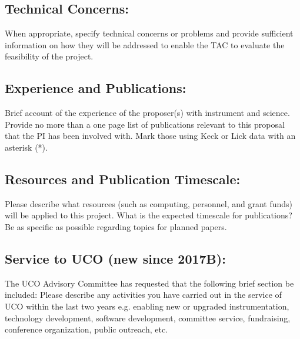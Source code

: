 \documentclass[letter,12pt]{article}
\begin{document}
\subsection{Technical Concerns:}
When appropriate, specify technical concerns or problems and provide sufficient information on how they will be addressed to enable the TAC to evaluate the feasibility of the project. 

\subsection{Experience and Publications:}
Brief account of the experience of the proposer(s) with instrument and science. Provide no more than a one page list of publications relevant to this proposal that the PI has been involved with. Mark those using Keck or Lick data with an asterisk (*). 

\subsection{Resources and Publication Timescale:}
Please describe what resources (such as computing, personnel, and grant funds) will be applied to this project. What is the expected timescale for publications? Be as specific as possible regarding topics for planned papers.

\subsection{Service to UCO (new since 2017B):}
The UCO Advisory Committee has requested that the following brief section be included: 
Please describe any activities you have carried out in the service of UCO within the last two years e.g. enabling new or upgraded instrumentation, technology development, software development, committee service, fundraising, conference organization, public outreach, etc.
\end{document}
